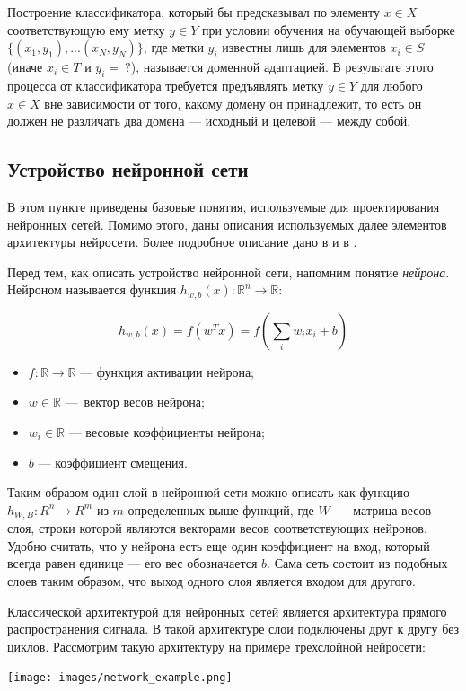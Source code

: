 \documentclass[14pt, a4paper]{extarticle}
\begin{document}
 Построение классификатора, который бы предсказывал по элементу $x \in X$ соответствующую ему метку $y \in Y$ при условии обучения на обучающей выборке $\{(x_1, y_1), ... (x_N, y_N)\}$, где метки $y_i$ известны лишь для элементов $x_i \in S$ (иначе $x_i \in T$ и  $y_i =~?$), называется доменной адаптацией. В результате этого процесса от классификатора требуется предъявлять метку $y \in Y$ для любого $x \in X$ вне зависимости от того, какому домену он принадлежит, то есть он должен не различать два домена — исходный и целевой — между собой. 

\subsection*{Устройство нейронной сети}

В этом пункте приведены базовые понятия, используемые для проектирования нейронных сетей. Помимо этого, даны описания используемых далее элементов архитектуры нейросети. Более подробное описание дано в \cite{deep_learning} и в \cite{haykin}.

Перед тем, как описать устройство нейронной сети, напомним понятие \textit{нейрона}. Нейроном называется функция $h_{w, b}(x): \mathbb{R}^{n} \rightarrow \mathbb{R}$:

\begin{equation*}
	h_{w, b}(x) = f(w^Tx) = f(\sum_i w_ix_i + b)
\end{equation*}
\begin{itemize}
\item $f: \mathbb{R} \rightarrow \mathbb{R} $ — функция активации нейрона;
\item $w \in \mathbb{R}$ — вектор весов нейрона;
\item $w_i \in \mathbb{R} $ — весовые коэффициенты нейрона;
\item $b$ — коэффициент смещения.
\end{itemize}

Таким образом один слой в нейронной сети можно описать как функцию $h_{W, B}: R^n \rightarrow R^m$ из $m$ определенных выше функций, где $W$ — матрица весов слоя, строки которой являются векторами весов соответствующих нейронов. Удобно считать, что у нейрона есть еще один коэффициент на вход, который всегда равен единице — его вес обозначается $b$. Сама сеть состоит из подобных слоев таким образом, что выход одного слоя является входом для другого. 

Классической архитектурой для нейронных сетей является архитектура прямого распространения сигнала. В такой архитектуре слои подключены друг к другу без циклов. Рассмотрим такую архитектуру на примере трехслойной нейросети:
\begin{center}
	\texttt{[image: images/network\_example.png]}
\end{center}
\end{document}
